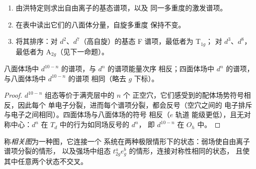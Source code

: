 \begin{method}[自由离子谱项的分裂]\label{met:b3:complex-spectra-magnetism:split-term}
\begin{enumerate}
  \item 由洪特定则求出自由离子的基态谱项，以及
        同一多重度的激发谱项。
  \item 在表中读出它们的八面体分量，自旋多重度
        保持不变。
  \item 将其排序：对 $d^2$、$d^7$（高自旋）的基态 F 谱项，最低者为 T$_{1g}$；
        对 $d^3$、$d^8$，最低者为 A$_{2g}$（见下一命题）。
\end{enumerate}
\end{method}

\begin{proposition}[空穴与四面体反转]\label{prop:b3:complex-spectra-magnetism:hole}
八面体场中 $d^{10-n}$ 的谱项，与 $d^n$ 的谱项能量次序
相反；四面体场中 $d^n$ 的谱项，与八面体场中 $d^{10-n}$ 的谱项
相同（略去 $g$ 下标）。
\end{proposition}

\begin{proof}
$d^{10-n}$ 组态等价于满壳层中的 $n$ 个
正空穴，它们感受到的配体场势符号相反，因此每个
单电子分裂，进而每个谱项分裂，都会反号（空穴之间的
电子排斥与电子之间相同）。四面体场与八面体场的符号
相反（$e$ 轨道
能级更低），且无对称中心：$d^n$ 在 $T_d$ 中的行为如同场反号的 $d^n$，
即 $d^{10-n}$ 在 $O_h$ 中。
\end{proof}

\begin{definition}[相关图]\label{def:b3:complex-spectra-magnetism:correlation}
称\emph{相关图}为一种图，它连接一个
系统在两种极限情形下的状态：弱场使自由离子谱项分裂的情形，
以及强场中组态 $t_{2g}^ae_g^b$ 的情形，连接对称性相同的状态，
且使其中任意两个状态不交叉。
\end{definition}

